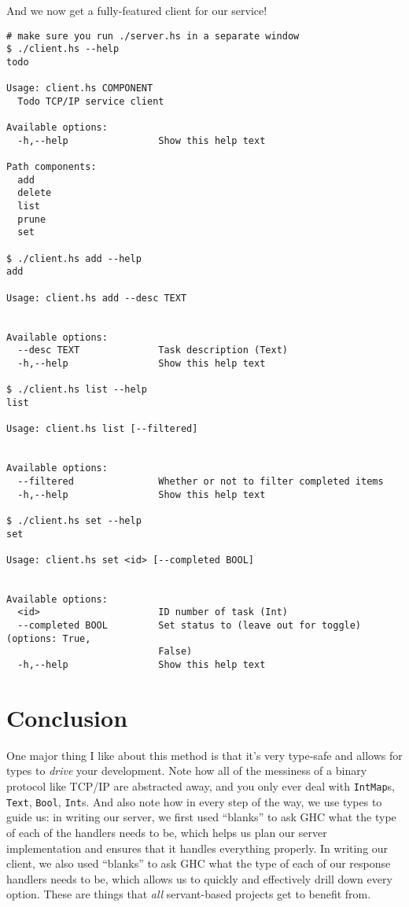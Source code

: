 \documentclass[]{article}
\begin{document}
And we now get a fully-featured client for our service!

\begin{verbatim}
# make sure you run ./server.hs in a separate window
$ ./client.hs --help
todo

Usage: client.hs COMPONENT
  Todo TCP/IP service client

Available options:
  -h,--help                Show this help text

Path components:
  add
  delete
  list
  prune
  set

$ ./client.hs add --help
add

Usage: client.hs add --desc TEXT


Available options:
  --desc TEXT              Task description (Text)
  -h,--help                Show this help text

$ ./client.hs list --help
list

Usage: client.hs list [--filtered]


Available options:
  --filtered               Whether or not to filter completed items
  -h,--help                Show this help text

$ ./client.hs set --help
set

Usage: client.hs set <id> [--completed BOOL]


Available options:
  <id>                     ID number of task (Int)
  --completed BOOL         Set status to (leave out for toggle) (options: True,
                           False)
  -h,--help                Show this help text
\end{verbatim}

\section{Conclusion}\label{conclusion}

One major thing I like about this method is that it's very type-safe and allows
for types to \emph{drive} your development. Note how all of the messiness of a
binary protocol like TCP/IP are abstracted away, and you only ever deal with
\texttt{IntMap}s, \texttt{Text}, \texttt{Bool}, \texttt{Int}s. And also note how
in every step of the way, we use types to guide us: in writing our server, we
first used ``blanks'' to ask GHC what the type of each of the handlers needs to
be, which helps us plan our server implementation and ensures that it handles
everything properly. In writing our client, we also used ``blanks'' to ask GHC
what the type of each of our response handlers needs to be, which allows us to
quickly and effectively drill down every option. These are things that
\emph{all} servant-based projects get to benefit from.
\end{document}
